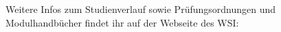%	

\vfill
Weitere Infos zum Studienverlauf sowie Prüfungsordnungen und Modulhandbücher
findet ihr auf der Webseite des WSI:

\pagebreak
